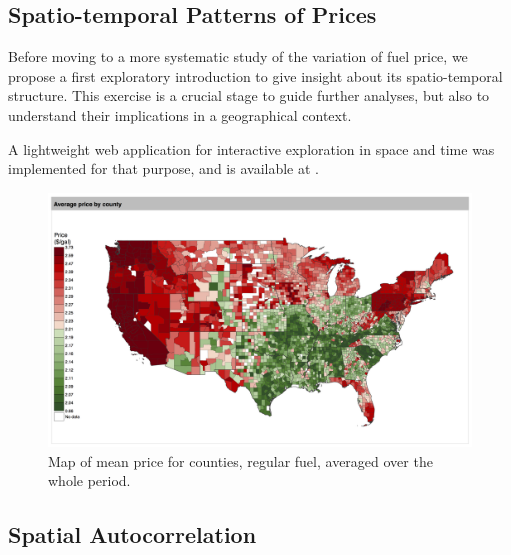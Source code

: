\documentclass[3p,times,procedia]{elsarticle}
\begin{document}
\subsection{Spatio-temporal Patterns of Prices}\label{subsec:patterns}


Before moving to a more systematic study of the variation of fuel price, we propose a first exploratory introduction to give insight about its spatio-temporal structure. This exercise is a crucial stage to guide further analyses, but also to understand their implications in a geographical context. 



A lightweight web application for interactive exploration in space and time was implemented for that purpose, and is available at \texttt{}.


\begin{figure}
\centering
\includegraphics[width=\textwidth]{figures/average_regular_map}
\caption{Map of mean price for counties, regular fuel, averaged over the whole period.}
\end{figure}


\subsection{Spatial Autocorrelation}
\end{document}
